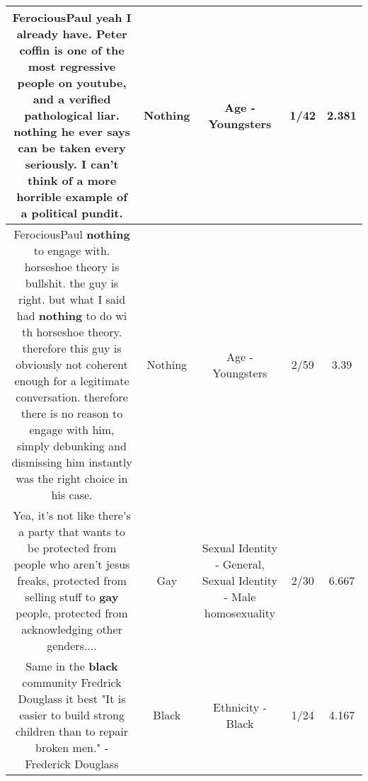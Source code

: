 \documentclass[11pt]{article}
\newlength\mylength
\begin{document}
\begin{center}
\begin{longtable}{|C{.65\mylength}|C{.30\mylength}|C{.12\mylength}|C{.12\mylength}|C{.12\mylength}|}
  \small FerociousPaul yeah I already have. Peter coffin is one of the most regressive people on youtube, and a verified pathological liar. \textbf{nothing} he ever says can be taken every seriously. I can't think of a more horrible example of a political pundit.\normalsize   & Nothing & Age - Youngsters & 1/42 & 2.381 \\  \hline
  \small FerociousPaul \textbf{nothing} to engage with. horseshoe theory is bullshit. the guy is right. but what I said had \textbf{nothing} to do wi th horseshoe theory. therefore this guy is obviously not coherent enough for a legitimate conversation. therefore there is no reason to engage with him, simply debunking and dismissing him instantly was the right choice in his case.\normalsize   & Nothing & Age - Youngsters & 2/59 & 3.39 \\  \hline
  \small Yea, it's not like there's a party that wants to be protected from people who aren't jesus freaks, protected from selling stuff to \textbf{g\textbf{ay}} people, protected from acknowledging other genders....\normalsize   & Gay & Sexual Identity - General, Sexual Identity - Male homosexuality & 2/30 & 6.667 \\  \hline
  \small Same in the \textbf{black} community Fredrick Douglass it best "It is easier to build strong children than to repair broken men." - Frederick Douglass\normalsize   & Black & Ethnicity - Black & 1/24 & 4.167 \\  \hline
  
\end{longtable}
\end{center}
\end{document}
